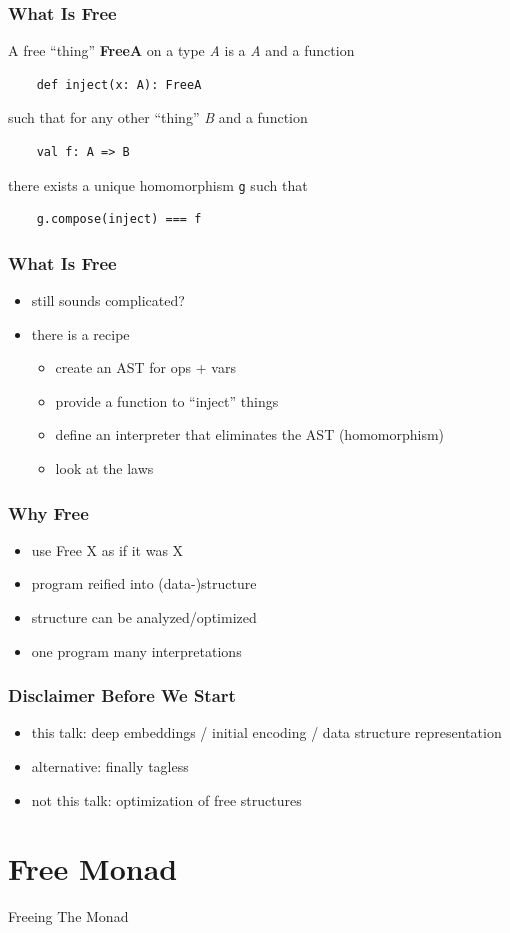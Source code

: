 \documentclass{beamer}
\newcommand{\recipe}{%
  \begin{itemize}
  \item create an AST for ops + vars
  \item provide a function to ``inject'' things
  \item define an interpreter that eliminates the AST (homomorphism)
  \item look at the laws
  \end{itemize}
}
\begin{document}
\begin{frame}[fragile]
  \frametitle{What Is Free} A free ``thing'' \textbf{FreeA} on a type
  \textit{A} is a \textit{A} and a function
  \begin{verbatim}
    def inject(x: A): FreeA
  \end{verbatim}
  such that for any other ``thing'' \textit{B} and a function
  \begin{verbatim}
    val f: A => B
  \end{verbatim}
  there exists a unique homomorphism \texttt{g} such that
  \begin{verbatim}
    g.compose(inject) === f
  \end{verbatim}
\end{frame}

\begin{frame}[fragile]
  \frametitle{What Is Free}
  \begin{itemize}
  \item still sounds complicated?
  \item there is a recipe
    \recipe{}
  \end{itemize}
\end{frame}

\begin{frame}
  \frametitle{Why Free}
  \begin{itemize}
  \item use Free X as if it was X
  \item program reified into (data-)structure
  \item structure can be analyzed/optimized
  \item one program \textemdash{} many interpretations
  \end{itemize}
\end{frame}

\begin{frame}
  \frametitle{Disclaimer Before We Start}
  \begin{itemize}
  \item this talk: deep embeddings / initial encoding / data structure representation
  \item alternative: finally tagless
  \item not this talk: optimization of free structures
  \end{itemize}
\end{frame}

\section{Free Monad}\label{sec:free-monad}
\begin{frame}
  \begin{center}
    \Huge
    Freeing The Monad
  \end{center}
\end{frame}
\end{document}
